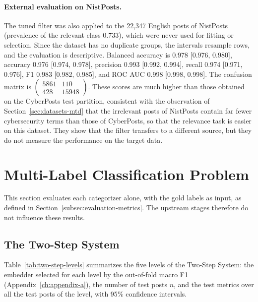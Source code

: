 \paragraph{External evaluation on NistPosts.} The tuned filter was also applied to the 22,347 English posts of NistPosts (prevalence of the relevant class 0.733), which were never used for fitting or selection. Since the dataset has no duplicate groups, the intervals resample rows, and the evaluation is descriptive. Balanced accuracy is 0.978 [0.976, 0.980], accuracy 0.976 [0.974, 0.978], precision 0.993 [0.992, 0.994], recall 0.974 [0.971, 0.976], F1 0.983 [0.982, 0.985], and ROC AUC 0.998 [0.998, 0.998]. The confusion matrix is $\begin{pmatrix}5861 & 110\\ 428 & 15948\end{pmatrix}$. These scores are much higher than those obtained on the CyberPosts test partition, consistent with the observation of Section~\ref{sec:datasets-mtd} that the irrelevant posts of NistPosts contain far fewer cybersecurity terms than those of CyberPosts, so that the relevance task is easier on this dataset. They show that the filter transfers to a different source, but they do not measure the performance on the target data.


\section{Multi-Label Classification Problem}\label{sec:multi-label-classification-problem}
This section evaluates each categorizer alone, with the gold labels as input, as defined in Section~\ref{subsec:evaluation-metrics}. The upstream stages therefore do not influence these results.

\subsection{The Two-Step System}\label{subsec:two-step-system}
Table~\ref{tab:two-step-levels} summarizes the five levels of the Two-Step System: the embedder selected for each level by the out-of-fold macro F1 (Appendix~\ref{ch:appendix-a}), the number of test posts $n$, and the test metrics over all the test posts of the level, with 95{\%} confidence intervals.

